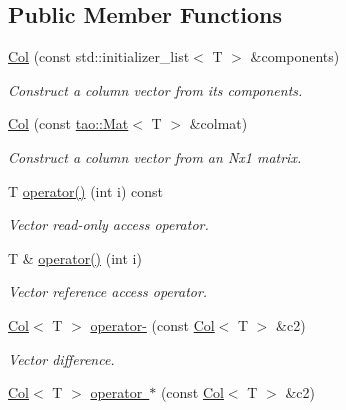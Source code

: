 \subsection*{Public Member Functions}
\begin{DoxyCompactItemize}
\item 
\mbox{\hyperlink{classtao_1_1_col_a9133bec2b352e2e139e51e1f9107473d}{Col}} (const std\+::initializer\+\_\+list$<$ T $>$ \&components)
\begin{DoxyCompactList}\small\item\em Construct a column vector from its components. \end{DoxyCompactList}\item 
\mbox{\label{classtao_1_1_col_af10fd1d477800a898d3c7eea90e5089c}} 
\mbox{\hyperlink{classtao_1_1_col_af10fd1d477800a898d3c7eea90e5089c}{Col}} (const \mbox{\hyperlink{classtao_1_1_mat}{tao\+::\+Mat}}$<$ T $>$ \&colmat)
\begin{DoxyCompactList}\small\item\em Construct a column vector from an Nx1 matrix. \end{DoxyCompactList}\item 
T \mbox{\hyperlink{classtao_1_1_col_a7d08ac2d077bed978eb783b5fe707a7c}{operator()}} (int i) const
\begin{DoxyCompactList}\small\item\em Vector read-\/only access operator. \end{DoxyCompactList}\item 
T \& \mbox{\hyperlink{classtao_1_1_col_ad7f3279e2764f5e1b0762e62517e738a}{operator()}} (int i)
\begin{DoxyCompactList}\small\item\em Vector reference access operator. \end{DoxyCompactList}\item 
\mbox{\hyperlink{classtao_1_1_col}{Col}}$<$ T $>$ \mbox{\hyperlink{classtao_1_1_col_a5c470640270acffdd3a33c9c99fd99ac}{operator-\/}} (const \mbox{\hyperlink{classtao_1_1_col}{Col}}$<$ T $>$ \&c2)
\begin{DoxyCompactList}\small\item\em Vector difference. \end{DoxyCompactList}\item 
\mbox{\hyperlink{classtao_1_1_col}{Col}}$<$ T $>$ \mbox{\hyperlink{classtao_1_1_col_a661dd9512fad58cfbedfdf52ca6806fb}{operator $\ast$}} (const \mbox{\hyperlink{classtao_1_1_col}{Col}}$<$ T $>$ \&c2)

\end{DoxyCompactItemize}
